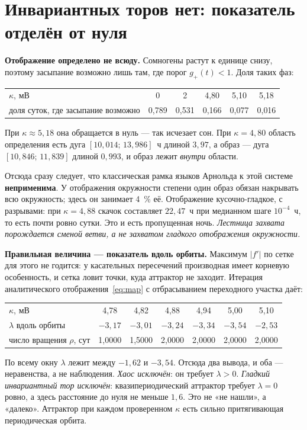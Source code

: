\documentclass[11pt,a4paper]{article}
\begin{document}
\section{Инвариантных торов нет: показатель отделён от нуля}
\textbf{Отображение определено не всюду.} Сомногены растут к единице снизу, поэтому засыпание
возможно лишь там, где порог $g_+(t)<1$. Доля таких фаз:
\begin{center}\small
\begin{tabular}{lccccc}
\toprule
$\kappa$, мВ & 0 & 2 & 4{,}80 & 5{,}10 & 5{,}18\\
доля суток, где засыпание возможно & 0{,}789 & 0{,}531 & 0{,}166 & 0{,}077 & 0{,}016\\
\bottomrule
\end{tabular}
\end{center}
При $\kappa\approx5{,}18$ она обращается в нуль --- так исчезает сон. При $\kappa=4{,}80$ область
определения есть дуга $[10{,}014;\,13{,}986]$~ч длиной $3{,}97$, а образ --- дуга
$[10{,}846;\,11{,}839]$ длиной $0{,}993$, и образ лежит \emph{внутри} области.

Отсюда сразу следует, что классическая рамка языков Арнольда к этой системе \textbf{неприменима}.
У отображения окружности степени один образ обязан накрывать всю окружность; здесь он занимает
4~\% её. Отображение кусочно-гладкое, с разрывами: при $\kappa=4{,}88$ скачок составляет
$22{,}47$~ч при медианном шаге $10^{-4}$~ч, то есть почти ровно сутки. Это и есть пропущенная ночь.
\emph{Лестница захвата порождается сменой ветви, а не захватом гладкого отображения окружности.}

\textbf{Правильная величина --- показатель вдоль орбиты.} Максимум $|f'|$ по сетке для этого не
годится: у касательных пересечений производная имеет корневую особенность, и сетка ловит точки, куда
аттрактор не заходит. Итерация аналитического отображения~\eqref{eq:map} с отбрасыванием переходного
участка даёт:
\begin{center}\small
\begin{tabular}{lcccccc}
\toprule
$\kappa$, мВ & 4{,}78 & 4{,}82 & 4{,}88 & 4{,}94 & 5{,}00 & 5{,}10\\
$\lambda$ вдоль орбиты & $-3{,}17$ & $-3{,}01$ & $-3{,}24$ & $-3{,}34$ & $-3{,}54$ & $-2{,}53$\\
число вращения $\rho$, сут & 1{,}0000 & 1{,}5000 & 2{,}0000 & 2{,}0000 & 2{,}0000 & 2{,}0000\\
\bottomrule
\end{tabular}
\end{center}
По всему окну $\lambda$ лежит между $-1{,}62$ и $-3{,}54$. Отсюда два вывода, и оба --- неравенства,
а не наблюдения. \emph{Хаос исключён}: он требует $\lambda>0$. \emph{Гладкий инвариантный тор
исключён}: квазипериодический аттрактор требует $\lambda=0$ ровно, а здесь расстояние до нуля не
меньше $1{,}6$. Это не «не нашли», а «далеко». Аттрактор при каждом проверенном $\kappa$ есть
сильно притягивающая периодическая орбита.
\end{document}
